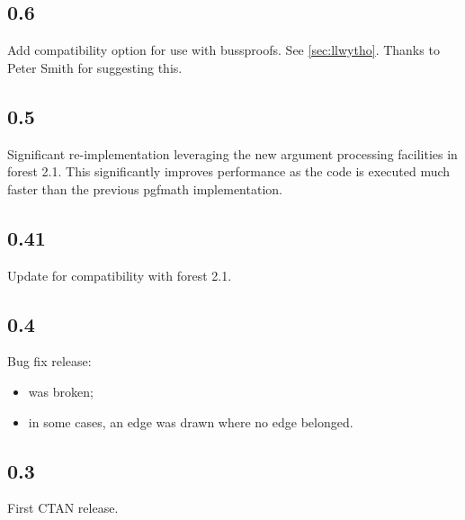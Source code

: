 \documentclass[10pt,british,a4paper]{ltxdoc}
\newcommand*\pkg[1]{\textsf{#1}}
\begin{document}
\subsection*{0.6}\label{subsec:v0.6}

Add compatibility option for use with \pkg{bussproofs}.
See \cref{sec:llwytho}.
Thanks to Peter Smith for suggesting this.


\subsection*{0.5}\label{subsec:v0.5}

Significant re-implementation leveraging the new argument processing facilities in \pkg{forest} 2.1.
This significantly improves performance as the code is executed much faster than the previous \pkg{pgfmath} implementation.


\subsection*{0.41}\label{subsec:v0.41}

Update for compatibility with \pkg{forest} 2.1.


\subsection*{0.4}\label{subsec:v0.4}

Bug fix release:
\begin{itemize}
  \item {} was broken;
  \item in some cases, an edge was drawn where no edge belonged.
\end{itemize}


\subsection*{0.3}\label{subsec:v0.3}

First CTAN release.



\printbibliography
\clearpage

%
\fancyheadoffset[lh]{0pt}%
\printindex
\end{document}
